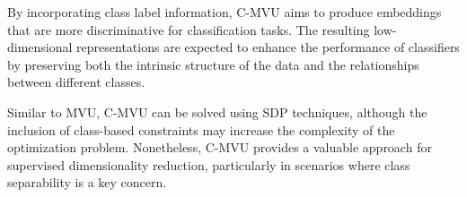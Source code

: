         By incorporating class label information, \ac{C-MVU} aims to produce embeddings that are more discriminative for classification tasks. The resulting low-dimensional representations are expected to enhance the performance of classifiers by preserving both the intrinsic structure of the data and the relationships between different classes.

        Similar to \ac{MVU}, \ac{C-MVU} can be solved using \ac{SDP} techniques, although the inclusion of class-based constraints may increase the complexity of the optimization problem. Nonetheless, \ac{C-MVU} provides a valuable approach for supervised dimensionality reduction, particularly in scenarios where class separability is a key concern.



